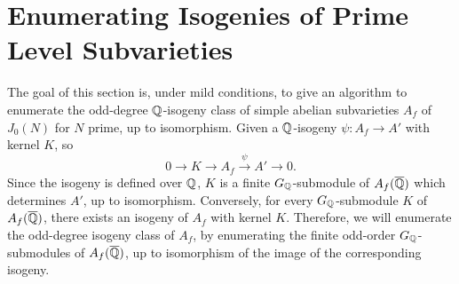 \documentclass{article}
\begin{document}
\tableofcontents
    
\section{Enumerating Isogenies of Prime Level Subvarieties}

The goal of this section is, under mild conditions, to give an algorithm to
enumerate the odd-degree $\mathbb{Q}$-isogeny class of simple abelian subvarieties
$A_f$ of $J_0(N)$ for $N$ prime, up to isomorphism. Given a $\mathbb{Q}$-isogeny
$\psi:A_f\to A'$ with kernel $K$, so
\[
    0 \to K \to A_f \overset{\psi}{\to} A' \to 0.
\]
Since the isogeny is defined over $\mathbb{Q}$, $K$ is a finite $G_{\mathbb{Q}}$-submodule of
$A_f(\overline{\mathbb{Q}})$ which determines $A'$, up to isomorphism. Conversely, for every
$G_{\mathbb{Q}}$-submodule $K$ of $A_f(\overline{\mathbb{Q}})$, there exists an isogeny of $A_f$ with
kernel $K$. Therefore, we will enumerate the odd-degree isogeny class of $A_f$,
by enumerating the finite odd-order $G_{\mathbb{Q}}$-submodules of $A_f(\overline{\mathbb{Q}})$, up to
isomorphism of the image of the corresponding isogeny. 
\end{document}
